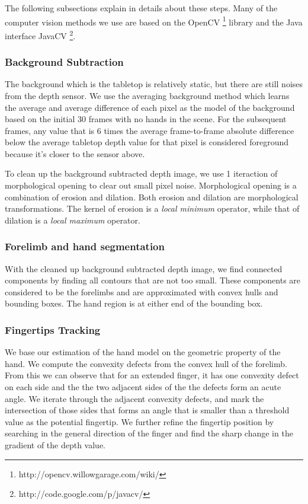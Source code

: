 The following subsections explain in details about these steps. Many of the
computer vision methods we use are based on the OpenCV
\footnote{http://opencv.willowgarage.com/wiki/} library and the Java interface JavaCV \footnote{http://code.google.com/p/javacv/}.

\subsubsection{Background Subtraction}
The background which is the tabletop is relatively static, but there are still 
noises from the depth sensor. We use the averaging background method which
learns the average and average difference of each pixel as the model of the 
background based on the initial 30 frames with no hands in the scene. For the
subsequent frames, any value that is 6 times the average frame-to-frame absolute
difference below the average tabletop depth value for that pixel is considered 
foreground because it's closer to the sensor above.

To clean up the background subtracted depth image, we use 1 iteraction of
morphological opening to clear out small pixel noise. Morphological opening is a
combination of erosion and dilation. Both erosion and dilation are morphological
transformations. The kernel of erosion is a \textit{local minimum} operator,
while that of dilation is a \textit{local maximum} operator.

\subsubsection{Forelimb and hand segmentation}
With the cleaned up background subtracted depth image, we find connected
components by finding all contours that are not too small. These components are
considered to be the forelimbs and are approximated with convex hulls and 
bounding boxes. The hand region is at either end of the bounding box.

\subsubsection{Fingertips Tracking}
We base our estimation of the hand model on the geometric property of the
hand. We compute the convexity defects from the convex hull of the forelimb.
From this we can observe that for an extended finger, it has one convexity
defect on each side and the the two adjacent sides of the the defects form an
acute angle. We iterate through the adjacent convexity defects, and mark the
intersection of those sides that forms an angle that is smaller than a threshold
value as the potential fingertip. We further refine the fingertip position by
searching in the general direction of the finger and find the sharp change in
the gradient of the depth value.

